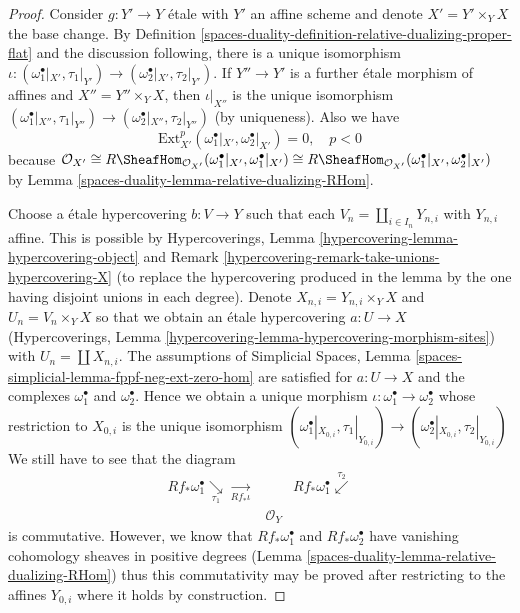 \begin{proof}
Consider $g : Y' \to Y$ \'etale with $Y'$ an affine scheme
and denote $X' = Y' \times_Y X$ the base change.
By Definition \ref{spaces-duality-definition-relative-dualizing-proper-flat}
and the discussion following, there is a unique isomorphism
$\iota : (\omega_1^\bullet|_{X'}, \tau_1|_{Y'}) \to
(\omega_2^\bullet|_{X'}, \tau_2|_{Y'})$. If $Y'' \to Y'$
is a further \'etale morphism of affines and $X'' = Y'' \times_Y X$,
then $\iota|_{X''}$ is the unique isomorphism
$(\omega_1^\bullet|_{X''}, \tau_1|_{Y''}) \to
(\omega_2^\bullet|_{X''}, \tau_2|_{Y''})$ (by uniqueness).
Also we have
$$
\text{Ext}^p_{X'}(\omega_1^\bullet|_{X'}, \omega_2^\bullet|_{X'}) = 0,
\quad p < 0
$$
because
$\mathcal{O}_{X'} \cong
R\SheafHom_{\mathcal{O}_{X'}}(\omega_1^\bullet|_{X'}, \omega_1^\bullet|_{X'})
\cong
R\SheafHom_{\mathcal{O}_{X'}}(\omega_1^\bullet|_{X'}, \omega_2^\bullet|_{X'})$
by Lemma \ref{spaces-duality-lemma-relative-dualizing-RHom}.

\medskip\noindent
Choose a \'etale hypercovering $b : V \to Y$ such that each
$V_n = \coprod_{i \in I_n} Y_{n, i}$ with $Y_{n, i}$ affine.
This is possible by Hypercoverings, Lemma
\ref{hypercovering-lemma-hypercovering-object} and
Remark \ref{hypercovering-remark-take-unions-hypercovering-X}
(to replace the hypercovering produced
in the lemma by the one having disjoint unions in each degree).
Denote $X_{n, i} = Y_{n, i} \times_Y X$ and $U_n = V_n \times_Y X$
so that we obtain an \'etale hypercovering
$a : U \to X$ (Hypercoverings, Lemma
\ref{hypercovering-lemma-hypercovering-morphism-sites})
with $U_n = \coprod X_{n, i}$.
The assumptions of Simplicial Spaces, Lemma
\ref{spaces-simplicial-lemma-fppf-neg-ext-zero-hom}
are satisfied for $a : U \to X$ and the complexes
$\omega_1^\bullet$ and $\omega_2^\bullet$.
Hence we obtain a unique morphism
$\iota : \omega_1^\bullet \to \omega_2^\bullet$
whose restriction to $X_{0, i}$ is the unique
isomorphism $(\omega_1^\bullet|_{X_{0, i}}, \tau_1|_{Y_{0, i}}) \to
(\omega_2^\bullet|_{X_{0, i}}, \tau_2|_{Y_{0, i}})$
We still have to see that the diagram
$$
\begin{array}{ccc}Rf_*\omega_1^\bullet \underset{\tau_1}{\searrow}\underset{Rf_*\iota}{\longrightarrow} &  & Rf_*\omega_1^\bullet \overset{\tau_2}{\swarrow} \\  & \mathcal{O}_Y & \end{array}
$$
is commutative. However, we know that $Rf_*\omega_1^\bullet$ and
$Rf_*\omega_2^\bullet$ have vanishing cohomology sheaves in positive
degrees (Lemma \ref{spaces-duality-lemma-relative-dualizing-RHom})
thus this commutativity may be proved after
restricting to the affines $Y_{0, i}$ where it holds by construction.
\end{proof}

